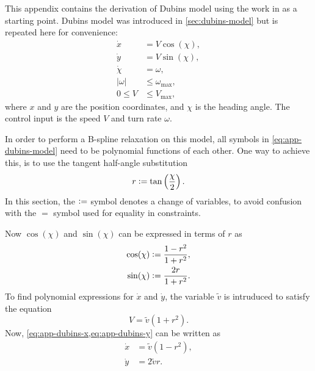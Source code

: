 This appendix contains the derivation of Dubins model using the work in \citet{mercy2017spline} as a starting point. 
Dubins model was introduced in \cref{sec:dubins-model} but is repeated here for convenience:
\begin{subequations}\label{eq:app-dubins-model}
    \begin{align}
        \dot x &= V \cos(\chi),       \label{eq:app-dubins-x} \\
        \dot y &= V \sin(\chi),       \label{eq:app-dubins-y} \\
        \dot \chi &= \omega,          \label{eq:app-dubins-chi} \\
        |\omega| &\leq \omega_{\max}, \label{eq:app-dubins-omega} \\
        0 \leq V &\leq V_{\max},      \label{eq:app-dubins-V} 
    \end{align}
\end{subequations}
where $x$ and $y$ are the position coordinates, and $\chi$ is the heading angle. The control input is the speed $V$ and turn rate $\omega$.

In order to perform a B-spline relaxation on this model, all symbols in \cref{eq:app-dubins-model} need to be polynomial functions of each other. One way to  achieve this, is to use the tangent half-angle substitution
\begin{equation}\label{eq:tangent-half-angle}
    r \vcentcolon= \tan\left(\frac{\chi}{2}\right).
\end{equation}
In this section, the $\vcentcolon=$ symbol denotes a change of variables, to avoid confusion with the $=$ symbol used for equality in constraints. 

Now $\cos(\chi)$ and $\sin(\chi)$ can be expressed in terms of $r$ as
\begin{subequations}\label{eq:cos-sin-r}
    \begin{align}
        \cos(\chi) &\vcentcolon= \frac{1 - r^2}{1 + r^2}, \label{eq:cos-r} \\
        \sin(\chi) &\vcentcolon= \frac{2r}{1 + r^2}.      \label{eq:sin-r}
    \end{align}
\end{subequations}
To find polynomial expressions for $\dot x$ and $\dot y$, the variable $\tilde v$ is intruduced to satisfy the equation
\begin{equation}\label{eq:constraint-V}
    V = \tilde v (1 + r^2).
\end{equation}
Now, \cref{eq:app-dubins-x,eq:app-dubins-y} can be written as
\begin{subequations}\label{eq:app-dubins-xy}
    \begin{align}
        \dot x &= \tilde v (1 - r^2), \label{eq:app-dubins-x-r} \\
        \dot y &= 2\tilde v r.        \label{eq:app-dubins-y-r}
    \end{align}
\end{subequations}

